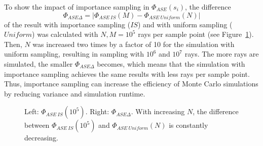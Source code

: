 To show the impact of importance sampling in $\Phi_{ASE}(s_i)$, the
difference
\[\Phi_{ASE\Delta} = |\Phi_{ASE~IS}(M) - \Phi_{ASE~Uniform}(N)|\] of the 
result with importance sampling ($IS$) and with uniform sampling
($Uniform$) was calculated with $N,M = 10^5$ rays per sample point
(see Figure~\ref{graphic:importance}).  Then, $N$ was increased two
times by a factor of 10 for the simulation with uniform sampling,
resulting in sampling with $10^6$ and $10^7$ rays.  The more rays are
simulated, the smaller $\Phi_{ASE\Delta}$ becomes, which means that
the simulation with importance sampling achieves the same results with
less rays per sample point. Thus, importance sampling can increase the
efficiency of Monte Carlo simulations by reducing variance and
simulation runtime.
\begin{figure}[H]
  \centerline
      {}
  \caption{Left: $\Phi_{ASE~IS}(10^5)$. Right:
    $\Phi_{ASE\Delta}$. With increasing $N$, the difference between
    $\Phi_{ASE~IS}(10^5)$ and $\Phi_{ASE~Uniform}(N)$ is constantly
    decreasing.}
  \label{graphic:importance}
\end{figure}
